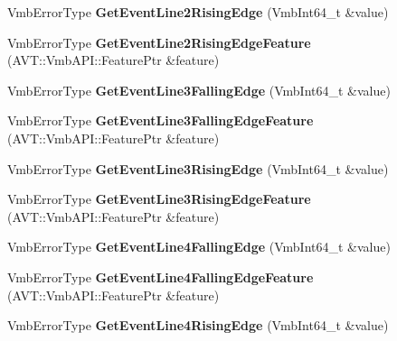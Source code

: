 \begin{DoxyCompactItemize}
\item 
\hypertarget{classMakoCamera_a81838424c2bb8d68c0744f13f46e668f}{Vmb\-Error\-Type {\bfseries Get\-Event\-Line2\-Rising\-Edge} (Vmb\-Int64\-\_\-t \&value)}\label{classMakoCamera_a81838424c2bb8d68c0744f13f46e668f}

\item 
\hypertarget{classMakoCamera_aee7b41a854c0668f536699d07a3f87af}{Vmb\-Error\-Type {\bfseries Get\-Event\-Line2\-Rising\-Edge\-Feature} (A\-V\-T\-::\-Vmb\-A\-P\-I\-::\-Feature\-Ptr \&feature)}\label{classMakoCamera_aee7b41a854c0668f536699d07a3f87af}

\item 
\hypertarget{classMakoCamera_a8d727977404d7775258554dcf91b89ab}{Vmb\-Error\-Type {\bfseries Get\-Event\-Line3\-Falling\-Edge} (Vmb\-Int64\-\_\-t \&value)}\label{classMakoCamera_a8d727977404d7775258554dcf91b89ab}

\item 
\hypertarget{classMakoCamera_a3147fd53954e049624b2a75229fe1cd4}{Vmb\-Error\-Type {\bfseries Get\-Event\-Line3\-Falling\-Edge\-Feature} (A\-V\-T\-::\-Vmb\-A\-P\-I\-::\-Feature\-Ptr \&feature)}\label{classMakoCamera_a3147fd53954e049624b2a75229fe1cd4}

\item 
\hypertarget{classMakoCamera_ac01e6488b56dded663c84589c037101c}{Vmb\-Error\-Type {\bfseries Get\-Event\-Line3\-Rising\-Edge} (Vmb\-Int64\-\_\-t \&value)}\label{classMakoCamera_ac01e6488b56dded663c84589c037101c}

\item 
\hypertarget{classMakoCamera_adc0a2619c70abd90717cc04c7b4b915e}{Vmb\-Error\-Type {\bfseries Get\-Event\-Line3\-Rising\-Edge\-Feature} (A\-V\-T\-::\-Vmb\-A\-P\-I\-::\-Feature\-Ptr \&feature)}\label{classMakoCamera_adc0a2619c70abd90717cc04c7b4b915e}

\item 
\hypertarget{classMakoCamera_a2a0663a8175023dd948c8c3bfe2fb691}{Vmb\-Error\-Type {\bfseries Get\-Event\-Line4\-Falling\-Edge} (Vmb\-Int64\-\_\-t \&value)}\label{classMakoCamera_a2a0663a8175023dd948c8c3bfe2fb691}

\item 
\hypertarget{classMakoCamera_a89ea53b578538bfc710bf88d798246c7}{Vmb\-Error\-Type {\bfseries Get\-Event\-Line4\-Falling\-Edge\-Feature} (A\-V\-T\-::\-Vmb\-A\-P\-I\-::\-Feature\-Ptr \&feature)}\label{classMakoCamera_a89ea53b578538bfc710bf88d798246c7}

\item 
\hypertarget{classMakoCamera_a935c1d0d9ff498a61a895f5343c80dcc}{Vmb\-Error\-Type {\bfseries Get\-Event\-Line4\-Rising\-Edge} (Vmb\-Int64\-\_\-t \&value)}\label{classMakoCamera_a935c1d0d9ff498a61a895f5343c80dcc}


\end{DoxyCompactItemize}
